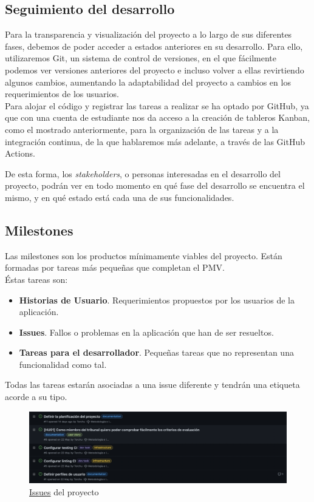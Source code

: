 \subsection{Seguimiento del desarrollo}
Para la transparencia y visualización del proyecto a lo largo de sus diferentes fases, debemos de poder acceder a
estados anteriores en su desarrollo. Para ello, utilizaremos Git, un sistema de control de versiones, en el que
fácilmente podemos ver versiones anteriores del proyecto e incluso volver a ellas revirtiendo algunos cambios,
aumentando la adaptabilidad del proyecto a cambios en los requerimientos de los usuarios.\\

Para alojar el código y registrar las tareas a realizar se ha optado por GitHub, ya que con una cuenta de estudiante
nos da acceso a la creación de tableros Kanban, como el mostrado anteriormente, para la organización de las tareas y a
la integración continua, de la que hablaremos más adelante, a través de las GitHub Actions.

De esta forma, los \textit{stakeholders}, o personas interesadas en el desarrollo del proyecto, podrán ver en todo
momento en qué fase del desarrollo se encuentra el mismo, y en qué estado está cada una de sus funcionalidades.\\

\subsection{Milestones}
Las milestones son los productos mínimamente viables del proyecto. Están formadas por tareas más pequeñas que completan
el PMV.\\

Éstas tareas son:
\begin{itemize}
    \item \textbf{Historias de Usuario}. Requerimientos propuestos por los usuarios de la aplicación.
    \item \textbf{Issues}. Fallos o problemas en la aplicación que han de ser resueltos.
    \item \textbf{Tareas para el desarrollador}. Pequeñas tareas que no representan una funcionalidad como tal.
\end{itemize}

Todas las tareas estarán asociadas a una issue diferente y tendrán una etiqueta acorde a su tipo.
\begin{figure}[H]
	\centering	
	\includegraphics[scale=0.25]{img/issues.png}
	\caption{\href{https://github.com/Torchu/flixbuff/issues}{Issues} del proyecto}\label{fig:github_issues}
\end{figure}

